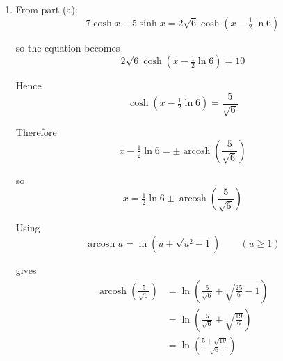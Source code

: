 \documentclass[leqno]{article}
\begin{document}
\begin{enumerate}[
  label=\textbf{\arabic*.},
  leftmargin=*,
  topsep=0pt,
  partopsep=0pt,
  parsep=0pt
]
\begin{djsSolution}
\begin{enumerate}[label=\textbf{(\alph*)}]
  we have
  \[
  R\cosh(x-\alpha)=R\cosh x\cosh\alpha-R\sinh x\sinh\alpha
  \]
  
  Comparing this with
  \[
  7\cosh x-5\sinh x
  \]

  gives
  \[
  R\cosh\alpha=7,
  \qquad
  R\sinh\alpha=5
  \]
  
  Now use \(\cosh^2\alpha-\sinh^2\alpha=1\):
  \begin{align*}
  R^2(\cosh^2\alpha-\sinh^2\alpha)&=7^2-5^2\\
  R^2&=49-25\\
  R^2&=24
  \end{align*}

  Since \(R>0\), we have
  \[
  R=2\sqrt6
  \]
  
  Also
  \[
  \tanh\alpha=\frac{\sinh\alpha}{\cosh\alpha}=\frac{5/R}{7/R}=\frac57
  \]

  Using
  \[
  \operatorname{artanh} u=\frac12\ln\left(\frac{1+u}{1-u}\right)\qquad (|u|<1)
  \]

  gives
  \begin{align*}
  \alpha&=\operatorname{artanh}\left(\frac57\right)\\
  &=\frac12\ln\left(\frac{1+\frac57}{1-\frac57}\right)\\
  &=\frac12\ln 6
  \end{align*}

  Therefore
  \[
  7\cosh x-5\sinh x=2\sqrt6\cosh\left(x-\tfrac12\ln6\right)
  \]

  with
  \[
  R=2\sqrt6,
  \qquad
  \alpha=\frac12\ln6\approx 0.896\qquad\text{(3 d.p.)}
  \]

  \item From part (a):
  \[
  7\cosh x-5\sinh x=2\sqrt6\cosh\left(x-\tfrac12\ln6\right)
  \]

  so the equation becomes
  \[
  2\sqrt6\cosh\left(x-\tfrac12\ln6\right)=10
  \]

  Hence
  \[
  \cosh\left(x-\tfrac12\ln6\right)=\frac{5}{\sqrt6}
  \]
  
  Therefore
  \[
  x-\tfrac12\ln6=\pm \operatorname{arcosh}\left(\frac{5}{\sqrt6}\right)
  \]

  so
  \[
  x=\tfrac12\ln6\pm \operatorname{arcosh}\left(\frac{5}{\sqrt6}\right)
  \]
  
  Using
  \[
  \operatorname{arcosh}u=\ln\left(u+\sqrt{u^2-1}\right)\qquad (u\ge 1)
  \]

  gives
  \begin{align*}
  \operatorname{arcosh}\left(\frac{5}{\sqrt6}\right)
  &=\ln\left(\frac{5}{\sqrt6}+\sqrt{\frac{25}{6}-1}\right)\\
  &=\ln\left(\frac{5}{\sqrt6}+\sqrt{\frac{19}{6}}\right)\\
  &=\ln\left(\frac{5+\sqrt{19}}{\sqrt6}\right)
  \end{align*}
  

\end{enumerate}
\end{djsSolution}
\end{enumerate}
\end{document}
